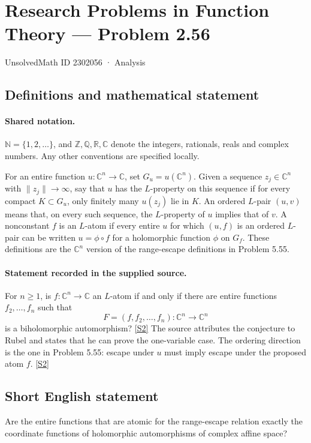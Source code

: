 \documentclass[11pt]{article}
\newcommand{\sref}[2]{\hyperlink{source:#1:#2}{[S#2]}}
\begin{document}
\setcounter{section}{2302055}
\section{Research Problems in Function Theory — Problem 2.56}\label{2302056}
{\small\sffamily UnsolvedMath ID 2302056 · Analysis}
\subsection{Definitions and mathematical statement}

\paragraph{Shared notation.}$\mathbb N=\{1,2,\ldots\}$, and $\mathbb Z,\mathbb Q,\mathbb R,\mathbb C$ denote the integers, rationals, reals and complex numbers. Any other conventions are specified locally.


For an entire function $u:\mathbb C^n\to\mathbb C$, set $G_u=u(\mathbb C^n)$. Given a sequence $z_j\in\mathbb C^n$ with $\|z_j\|\to\infty$, say that $u$ has the $L$-property on this sequence if for every compact $K\subset G_u$, only finitely many $u(z_j)$ lie in $K$.
An ordered $L$-pair $(u,v)$ means that, on every such sequence, the $L$-property of $u$ implies that of $v$.
A nonconstant $f$ is an $L$-atom if every entire $u$ for which $(u,f)$ is an ordered $L$-pair can be written $u=\phi\circ f$ for a holomorphic function $\phi$ on $G_f$.
These definitions are the $\mathbb C^n$ version of the range-escape definitions in Problem 5.55.

\paragraph{Statement recorded in the supplied source.}
For $n\ge1$, is $f:\mathbb C^n\to\mathbb C$ an $L$-atom if and only if there are entire functions $f_2,\ldots,f_n$ such that
\[F=(f,f_2,\ldots,f_n):\mathbb C^n\longrightarrow\mathbb C^n\]
is a biholomorphic automorphism? \sref{2302056}{2}
The source attributes the conjecture to Rubel and states that he can prove the one-variable case. The ordering direction is the one in Problem 5.55: escape under $u$ must imply escape under the proposed atom $f$. \sref{2302056}{2}
\subsection{Short English statement}
Are the entire functions that are atomic for the range-escape relation exactly the coordinate functions of holomorphic automorphisms of complex affine space?
\end{document}
